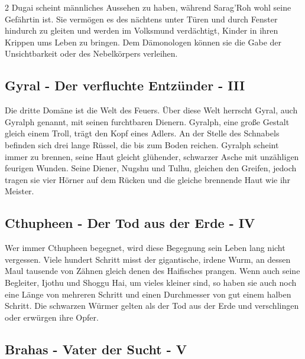 \begin{multicols*}{2}
Dugai scheint männliches Aussehen zu haben, während Sarag'Roh wohl seine Gefährtin ist.
Sie vermögen es des nächtens unter Türen und durch Fenster hindurch zu gleiten und werden im Volksmund verdächtigt, Kinder in ihren Krippen ums Leben zu bringen.
Dem Dämonologen können sie die Gabe der Unsichtbarkeit oder des Nebelkörpers verleihen.

\subsection{Gyral - Der verfluchte Entzünder - III}\label{subsec:gyral-der-verfluchte-entzunder}

Die dritte Domäne ist die Welt des Feuers.
Über diese Welt herrscht Gyral, auch Gyralph genannt, mit seinen furchtbaren Dienern.
Gyralph, eine große Gestalt gleich einem Troll, trägt den Kopf eines Adlers.
An der Stelle des Schnabels befinden sich drei lange Rüssel, die bis zum Boden reichen.
Gyralph scheint immer zu brennen, seine Haut gleicht glühender, schwarzer Asche mit unzähligen feurigen Wunden.
Seine Diener, Nugshu und Tulhu, gleichen den Greifen, jedoch tragen sie vier Hörner auf dem Rücken und die gleiche brennende Haut wie ihr Meister.

\subsection{Cthupheen - Der Tod aus der Erde - IV}\label{subsec:cthupheen-der-tod-aus-der-erde}

Wer immer Cthupheen begegnet, wird diese Begegnung sein Leben lang nicht vergessen.
Viele hundert Schritt misst der gigantische, irdene Wurm, an dessen Maul tausende von Zähnen gleich denen des Haifisches prangen.
Wenn auch seine Begleiter, Ijothu und Shoggu Hai, um vieles kleiner sind, so haben sie auch noch eine Länge von mehreren Schritt und einen Durchmesser von gut einem halben Schritt.
Die schwarzen Würmer gelten als der Tod aus der Erde und verschlingen oder erwürgen ihre Opfer.

\subsection{Brahas - Vater der Sucht - V}\label{subsec:brahas-vater-der-sucht}


\end{multicols*}
